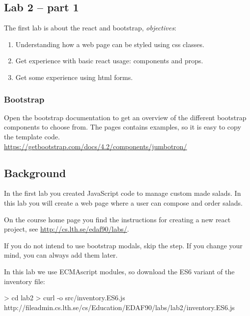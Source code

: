 \documentclass[fleqn, article, a4paper]{memoir}
\begin{document}
\maketitle
\thispagestyle{titlepage}
\vspace{-4cm}

\subsection*{Lab 2 -- part 1}

\n The first lab is about the react and bootstrap, \emph{objectives}:

\begin{enumerate}\firmlist
\item Understanding how a web page can be styled using css classes.
\item Get experience with basic react usage: components and props.
\item Get some experience using html forms.
\end{enumerate}

\subsubsection*{Bootstrap}
Open the bootstrap documentation to get an overview of the different bootstrap components to choose from. The pages contains examples, so it is easy to copy the template code.
\\ \url{https://getbootstrap.com/docs/4.2/components/jumbotron/}

\subsection*{Background}

In the first lab you created JavaScript code to manage custom made salads. In this lab you will create a web page where a user can compose and order salads.

On the course home page you find the instructions for creating a new react project, see \url{http://cs.lth.se/edaf90/labs/}.

If you do not intend to use bootstrap modals, skip the  step. If you change your mind, you can always add them later.

In this lab we use ECMAscript modules, so download the ES6 variant of the inventory file:
\begin{Code}
> cd lab2
> curl -o src/inventory.ES6.js 
          http://fileadmin.cs.lth.se/cs/Education/EDAF90/labs/lab2/inventory.ES6.js
\end{Code}
\end{document}
